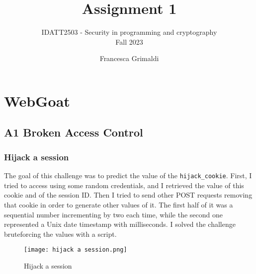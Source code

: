 \documentclass{article}
\title{%
    \huge Assignment 1
}
\subtitle{%
    IDATT2503 - Security in programming and cryptography\\
    Fall 2023
}
\author{%
  Francesca Grimaldi
}
\date{}
\begin{document}
\maketitle




\section{WebGoat}
\subsection{A1 Broken Access Control}
\subsubsection{Hijack a session}
The goal of this challenge was to predict the value of the \texttt{hijack\_cookie}.
First, I tried to access using some random credentials, and I retrieved the value of this cookie and of the session ID.
Then I tried to send other POST requests removing that cookie in order to generate other values of it.
The first half of it was a sequential number incrementing by two each time, while the second one represented a Unix date timestamp with milliseconds.
I solved the challenge bruteforcing the values with a script.
\begin{figure}[H]
    \centering
    \texttt{[image: hijack a session.png]}
    \caption{Hijack a session}
    \label{fig:hijack_a_session}
\end{figure}
\end{document}
